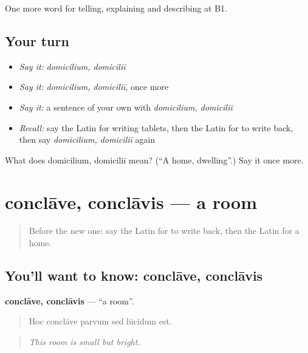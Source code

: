 \begin{grammarlens}[title={What you've built}]
One more word for telling, explaining and describing at B1.
\end{grammarlens}

\subsection*{Your turn}
\begin{itemize}
\raggedright
  \item \emph{Say it:} \emph{domicilium, domiciliī}
  \item \emph{Say it:} \emph{domicilium, domiciliī}, once more
  \item \emph{Say it:} a sentence of your own with \emph{domicilium, domiciliī}
  \item \emph{Recall:} say the Latin for writing tablets, then the Latin for to write back, then say \emph{domicilium, domiciliī} again
\end{itemize}

\begin{tcolorbox}[breakable,colback=teal!4,colframe=teal!35!black,title={Before you move on}]
What does domicilium, domiciliī mean? (\textquotedblleft{}A home, dwelling\textquotedblright{}.) Say it once more.
\end{tcolorbox}
\section[conclāve, conclāvis]{conclāve, conclāvis — a room}

\label{lesson:LA-C552-conclave}



\begin{quote}
Before the new one: say the Latin for to write back, then the Latin for a home.
\end{quote}

\subsection*{You'll want to know: conclāve, conclāvis}
\textbf{conclāve, conclāvis} — \textquotedblleft{}a room\textquotedblright{}.

\begin{quote}
Hoc conclāve parvum sed lūcidum est.
\end{quote}

\begin{quote}
\emph{This room is small but bright.}
\end{quote}

